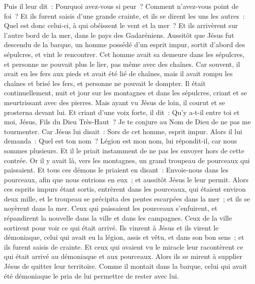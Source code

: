 \begin{multicols}{2}
Puis il leur dit~: Pourquoi avez-vous si peur~? Comment n'avez-vous point de foi~?
Et ils furent saisis d'une grande crainte, et ils se dirent les uns les autres~: Quel est donc celui-ci, à qui obéissent le vent et la mer~?
\VerseOne{}Et ils arrivèrent sur l'autre bord de la mer, dans le pays des Gadaréniens.
Aussitôt que Jésus fut descendu de la barque, un homme possédé d'un esprit impur, sortit d'abord des sépulcres, et vint le rencontrer.
Cet homme avait sa demeure dans les sépulcres, et personne ne pouvait plus le lier, pas même avec des chaînes.
Car souvent, il avait eu les fers aux pieds et avait été lié de chaînes, mais il avait rompu les chaînes et brisé les fers, et personne ne pouvait le dompter.
Il était continuellement, nuit et jour sur les montagnes et dans les sépulcres, criant et se meurtrissant avec des pierres.
Mais ayant vu Jésus de loin, il courut et se prosterna devant lui.
Et criant d'une voix forte, il dit~: Qu'y a-t-il entre toi et moi, Jésus, Fils du Dieu Très-Haut~? Je te conjure au Nom de Dieu de ne pas me tourmenter.
Car Jésus lui disait~: Sors de cet homme, esprit impur.
Alors il lui demanda~: Quel est ton nom~? Légion est mon nom, lui répondit-il, car nous sommes plusieurs.
Et il le priait instamment de ne pas les envoyer hors de cette contrée.
Or il y avait là, vers les montagnes, un grand troupeau de pourceaux qui paissaient.
Et tous ces démons le priaient en disant~: Envoie-nous dans les pourceaux, afin que nous entrions en eux~;
et aussitôt Jésus le leur permit. Alors ces esprits impurs étant sortis, entrèrent dans les pourceaux, qui étaient environ deux mille, et le troupeau se précipita des pentes escarpées dans la mer~; et ils se noyèrent dans la mer.
Ceux qui paissaient les pourceaux s'enfuirent, et répandirent la nouvelle dans la ville et dans les campagnes. Ceux de la ville sortirent pour voir ce qui était arrivé.
Ils vinrent à Jésus et ils virent le démoniaque, celui qui avait eu la légion, assis et vêtu, et dans son bon sens~; et ils furent saisis de crainte.
Et ceux qui avaient vu le miracle leur racontèrent ce qui était arrivé au démoniaque et aux pourceaux.
Alors ils se mirent à supplier Jésus de quitter leur territoire.
Comme il montait dans la barque, celui qui avait été démoniaque le pria de lui permettre de rester avec lui.

\end{multicols}
